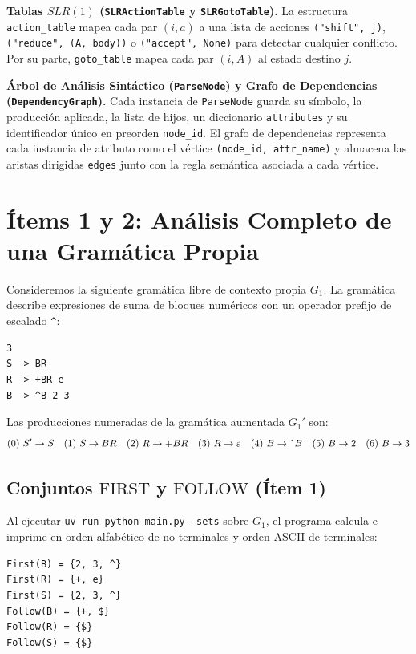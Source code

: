 \documentclass[11pt,a4paper]{article}
\begin{document}
\textbf{Tablas $SLR(1)$ (\texttt{SLRActionTable} y \texttt{SLRGotoTable}).} La estructura \texttt{action\_table} mapea cada par $(i, a)$ a una lista de acciones \texttt{("shift", j)}, \texttt{("reduce", (A, body))} o \texttt{("accept", None)} para detectar cualquier conflicto. Por su parte, \texttt{goto\_table} mapea cada par $(i, A)$ al estado destino $j$.

\textbf{\'Arbol de An\'alisis Sint\'actico (\texttt{ParseNode}) y Grafo de Dependencias (\texttt{DependencyGraph}).} Cada instancia de \texttt{ParseNode} guarda su s\'imbolo, la producci\'on aplicada, la lista de hijos, un diccionario \texttt{attributes} y su identificador \'unico en preorden \texttt{node\_id}. El grafo de dependencias representa cada instancia de atributo como el v\'ertice \texttt{(node\_id, attr\_name)} y almacena las aristas dirigidas \texttt{edges} junto con la regla sem\'antica asociada a cada v\'ertice.

\section{\'Items 1 y 2: An\'alisis Completo de una Gram\'atica Propia}

Consideremos la siguiente gram\'atica libre de contexto propia $G_1$. La gram\'atica describe expresiones de suma de bloques num\'ericos con un operador prefijo de escalado \texttt{\^{}}:

\begin{lstlisting}
3
S -> BR
R -> +BR e
B -> ^B 2 3
\end{lstlisting}

Las producciones numeradas de la gram\'atica aumentada $G_1'$ son:
\[
(0)\ S' \to S \quad
(1)\ S \to B R \quad
(2)\ R \to + B R \quad
(3)\ R \to \varepsilon \quad
(4)\ B \to \text{\^{}} B \quad
(5)\ B \to 2 \quad
(6)\ B \to 3
\]

\subsection{\texorpdfstring{Conjuntos $\text{FIRST}$ y $\text{FOLLOW}$ (\'Item 1)}{Conjuntos FIRST y FOLLOW (Item 1)}}
Al ejecutar \texttt{uv run python main.py --sets} sobre $G_1$, el programa calcula e imprime en orden alfab\'etico de no terminales y orden ASCII de terminales:

\begin{lstlisting}
First(B) = {2, 3, ^}
First(R) = {+, e}
First(S) = {2, 3, ^}
Follow(B) = {+, $}
Follow(R) = {$}
Follow(S) = {$}
\end{lstlisting}
\end{document}
